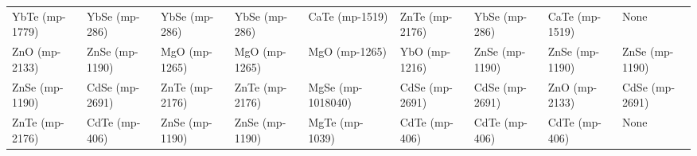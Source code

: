 \begin{longtable}{lllllllll}
   YbTe (mp-1779) &     YbSe (mp-286) &       YbSe (mp-286) &     YbSe (mp-286) &      CaTe (mp-1519) &    ZnTe (mp-2176) &     YbSe (mp-286) &    CaTe (mp-1519) &              None \\
    ZnO (mp-2133) &    ZnSe (mp-1190) &       MgO (mp-1265) &     MgO (mp-1265) &       MgO (mp-1265) &     YbO (mp-1216) &    ZnSe (mp-1190) &    ZnSe (mp-1190) &    ZnSe (mp-1190) \\
   ZnSe (mp-1190) &    CdSe (mp-2691) &      ZnTe (mp-2176) &    ZnTe (mp-2176) &   MgSe (mp-1018040) &    CdSe (mp-2691) &    CdSe (mp-2691) &     ZnO (mp-2133) &    CdSe (mp-2691) \\
   ZnTe (mp-2176) &     CdTe (mp-406) &      ZnSe (mp-1190) &    ZnSe (mp-1190) &      MgTe (mp-1039) &     CdTe (mp-406) &     CdTe (mp-406) &     CdTe (mp-406) &              None \\
\end{longtable}
